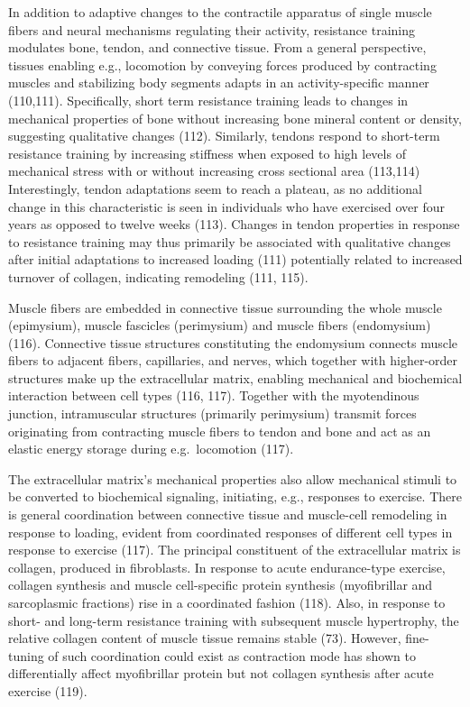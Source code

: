 \documentclass[twoside,10pt]{gihclass} %
\begin{document}
In addition to adaptive changes to the contractile apparatus of single muscle fibers and neural mechanisms regulating their activity, resistance training modulates bone, tendon, and connective tissue.
From a general perspective, tissues enabling e.g., locomotion by conveying forces produced by contracting muscles and stabilizing body segments adapts in an activity-specific manner
(110,111).
Specifically, short term resistance training leads to changes in mechanical properties of bone without increasing bone mineral content or density, suggesting qualitative changes
(112).
Similarly, tendons respond to short-term resistance training by increasing stiffness when exposed to high levels of mechanical stress with or without increasing cross sectional area
(113,114)
Interestingly, tendon adaptations seem to reach a plateau, as no additional change in this characteristic is seen in individuals who have exercised over four years as opposed to twelve weeks
(113).
Changes in tendon properties in response to resistance training may thus primarily be associated with qualitative changes after initial adaptations to increased loading
(111)
potentially related to increased turnover of collagen, indicating remodeling
(111, 115).

Muscle fibers are embedded in connective tissue surrounding the whole muscle (epimysium), muscle fascicles (perimysium) and muscle fibers (endomysium)
(116).
Connective tissue structures constituting the endomysium connects muscle fibers to adjacent fibers, capillaries, and nerves, which together with higher-order structures make up the extracellular matrix, enabling mechanical and biochemical interaction between cell types
(116, 117).
Together with the myotendinous junction, intramuscular structures (primarily perimysium) transmit forces originating from contracting muscle fibers to tendon and bone and act as an elastic energy storage during e.g.~locomotion
(117).

The extracellular matrix's mechanical properties also allow mechanical stimuli to be converted to biochemical signaling, initiating, e.g., responses to exercise.
There is general coordination between connective tissue and muscle-cell remodeling in response to loading, evident from coordinated responses of different cell types in response to exercise
(117).
The principal constituent of the extracellular matrix is collagen, produced in fibroblasts.
In response to acute endurance-type exercise, collagen synthesis and muscle cell-specific protein synthesis (myofibrillar and sarcoplasmic fractions) rise in a coordinated fashion
(118).
Also, in response to short- and long-term resistance training with subsequent muscle hypertrophy, the relative collagen content of muscle tissue remains stable
(73).
However, fine-tuning of such coordination could exist as contraction mode has shown to differentially affect myofibrillar protein but not collagen synthesis after acute exercise
(119).
\end{document}
